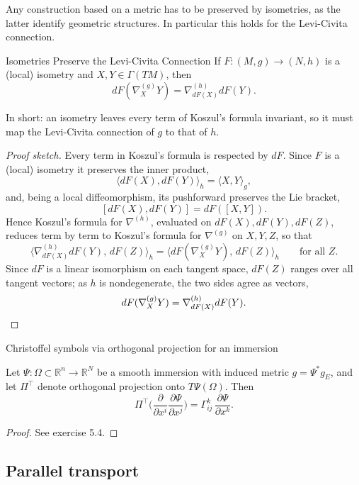 Any construction based on a metric has to be preserved by isometries, as the latter identify geometric structures. In particular this holds for the Levi-Civita connection.
\begin{colorlem}{Isometries Preserve the Levi-Civita Connection}{}
If $F: (M, g) \longrightarrow (N, h)$ is a (local) isometry and $X, Y \in \Gamma(TM)$, then
\[
dF(\nabla_X^{(g)} Y) = \nabla_{dF(X)}^{(h)} dF(Y).
\]
\end{colorlem}

In short: an isometry leaves every term of Koszul's formula invariant, so it must map the Levi-Civita connection of $g$ to that of $h$.\\

\begin{proof}[Proof sketch]
Every term in Koszul's formula is respected by $dF$. Since $F$ is a (local) isometry it preserves the inner product,
\[
\langle dF(X), dF(Y) \rangle_h = \langle X, Y \rangle_g ,
\]
and, being a local diffeomorphism, its pushforward preserves the Lie bracket,
\[
[dF(X), dF(Y)] = dF([X, Y]) .
\]
Hence Koszul's formula for $\nabla^{(h)}$, evaluated on $dF(X), dF(Y), dF(Z)$, reduces term by term to Koszul's formula for $\nabla^{(g)}$ on $X, Y, Z$, so that
\[
\langle \nabla^{(h)}_{dF(X)} dF(Y),\, dF(Z) \rangle_h = \langle dF(\nabla^{(g)}_X Y),\, dF(Z) \rangle_h
\qquad \text{for all } Z .
\]
Since $dF$ is a linear isomorphism on each tangent space, $dF(Z)$ ranges over all tangent vectors; as $h$ is nondegenerate, the two sides agree as vectors,
\[
dF(\nabla^{(g)}_X Y) = \nabla^{(h)}_{dF(X)} dF(Y) . \qedhere
\]
\end{proof}


\begin{colorlem}{Christoffel symbols via orthogonal projection for an immersion}{}


Let $\Psi:\Omega\subset\mathbb{R}^n\to\mathbb{R}^N$ be a smooth immersion with induced metric $g=\Psi^* g_E$, and let $\Pi^\top$ denote orthogonal projection onto $T\Psi(\Omega)$. Then
\[
\Pi^\top\Big(\frac{\partial}{\partial x^i}\frac{\partial \Psi}{\partial x^j}\Big) = \Gamma^k_{ij}\,\frac{\partial\Psi}{\partial x^k}.
\]
\end{colorlem}

\begin{proof}
See exercise 5.4.
\end{proof}





\subsection{Parallel transport}

